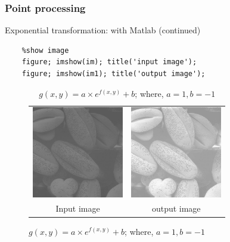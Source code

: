 \documentclass[english,11pt,table,handout]{beamer}
\begin{document}
\begin{frame}[fragile]
\frametitle{Point processing}

\begin{block}{Exponential transformation: with Matlab (continued)}
	\begin{lstlisting}
	%show image
	figure; imshow(im); title('input image');
	figure; imshow(im1); title('output image');
	\end{lstlisting}
\end{block}
\begin{figure}[!h]
	\begin{table}
		\begin{tabular}{cc}
			\includegraphics[height=4cm]{./images/coffeebean.png} &
			\includegraphics[height=4cm]{./images/coffeebean1.png} \\
			Input image & output image
			
		\end{tabular}
		\caption{$g(x,y) = a \times e^{f(x,y)} + b$; where, $a = 1, b = -1$}
	\end{table}
\end{figure}

\end{frame}
\end{document}
